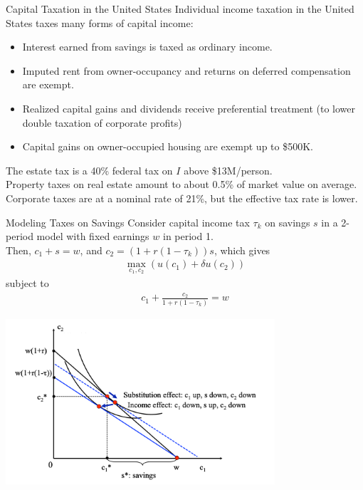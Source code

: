 \documentclass[10pt]{extarticle}
\begin{document}
  \begin{problem}{Capital Taxation in the United States}
    Individual income taxation in the United States taxes many forms of capital income:
    \begin{itemize}
      \item Interest earned from savings is taxed as ordinary income.
      \item Imputed rent from owner-occupancy and returns on deferred compensation are exempt.
      \item Realized capital gains and dividends receive preferential treatment (to lower double taxation of corporate profits)
      \item Capital gains on owner-occupied housing are exempt up to \$500K.
    \end{itemize}
    The estate tax is a 40\% federal tax on $I$ above \$13M/person.\\

    Property taxes on real estate amount to about 0.5\% of market value on average.\\

    Corporate taxes are at a nominal rate of 21\%, but the effective tax rate is lower.
  \end{problem}
  \begin{problem}{Modeling Taxes on Savings}
    Consider capital income tax $\tau_k$ on savings $s$ in a 2-period model with fixed earnings $w$ in period 1.\\

    Then, $c_1 + s = w$, and $c_2 = (1+r(1-\tau_k))s$, which gives
    \begin{align*}
      \max_{c_1,c_2}\left(u(c_1) + \delta u(c_2)\right)
    \end{align*}
    subject to
    \begin{align*}
      c_1 + \frac{c_2}{1 + r(1-\tau_k)} =w
    \end{align*}
    \begin{center}
      \includegraphics[width=10cm]{images/two_period_savings_tax.png}
    \end{center}
  \end{problem}
\end{document}

